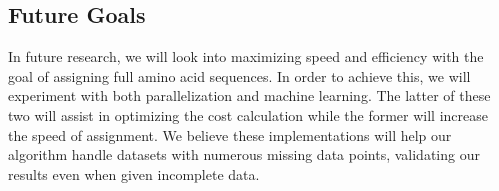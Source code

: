 \documentclass[12pt, letter]{article}
\begin{document}
\subsection{Future Goals} %
\label{sub:future_goals}
In future research, we will look into maximizing speed and efficiency with the goal of assigning  full amino acid sequences. In order to achieve this, we will experiment with both parallelization  and machine learning. The latter of these two will assist in optimizing the cost calculation while the former will increase the speed of assignment. We believe these implementations will help our algorithm handle datasets with numerous missing data points, validating our results even when given incomplete data.


\end{document}
